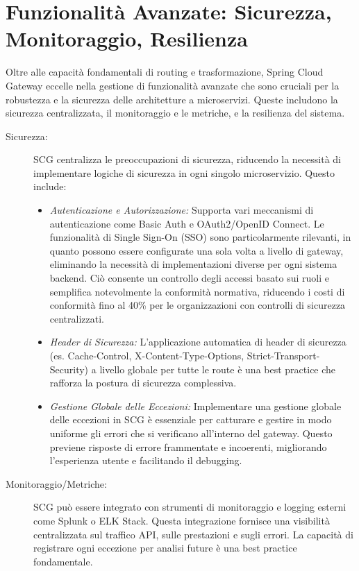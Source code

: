 \section{Funzionalità Avanzate: Sicurezza, Monitoraggio, Resilienza}

Oltre alle capacità fondamentali di routing e trasformazione, Spring Cloud Gateway eccelle nella gestione di funzionalità avanzate che sono cruciali per la robustezza e la sicurezza delle architetture a microservizi. Queste includono la sicurezza centralizzata, il monitoraggio e le metriche, e la resilienza del sistema.
\begin{description}
    \item[Sicurezza:] SCG centralizza le preoccupazioni di sicurezza, riducendo la necessità di implementare logiche di sicurezza in ogni singolo microservizio. Questo include:
    \begin{itemize}
        \item \textit{Autenticazione e Autorizzazione:} Supporta vari meccanismi di autenticazione come Basic Auth e OAuth2/OpenID Connect. Le funzionalità di Single Sign-On (SSO) sono particolarmente rilevanti, in quanto possono essere configurate una sola volta a livello di gateway, eliminando la necessità di implementazioni diverse per ogni sistema backend. Ciò consente un controllo degli accessi basato sui ruoli e semplifica notevolmente la conformità normativa, riducendo i costi di conformità fino al 40\% per le organizzazioni con controlli di sicurezza centralizzati.
        \item \textit{Header di Sicurezza:} L'applicazione automatica di header di sicurezza (es. Cache-Control, X-Content-Type-Options, Strict-Transport-Security) a livello globale per tutte le route è una best practice che rafforza la postura di sicurezza complessiva.
        \item \textit{Gestione Globale delle Eccezioni:} Implementare una gestione globale delle eccezioni in SCG è essenziale per catturare e gestire in modo uniforme gli errori che si verificano all'interno del gateway. Questo previene risposte di errore frammentate e incoerenti, migliorando l'esperienza utente e facilitando il debugging.
    \end{itemize}
    \item[Monitoraggio/Metriche:] SCG può essere integrato con strumenti di monitoraggio e logging esterni come Splunk o ELK Stack. Questa integrazione fornisce una visibilità centralizzata sul traffico API, sulle prestazioni e sugli errori. La capacità di registrare ogni eccezione per analisi future è una best practice fondamentale.

\end{description}
